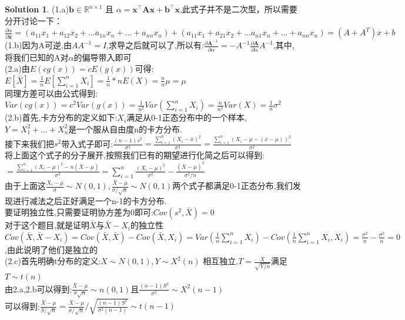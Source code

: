 \documentclass[a4paper,UTF8]{article}
\numberwithin{equation}{section}
\theoremstyle{definition}
\newtheorem*{solution}{Solution}
\def \A {\mathbf{A}}
\def \x {\boldsymbol{x}}
\def \b {\mathbf{b}}
\begin{document}
\begin{solution}
    (1.a)$\b\in\mathbb{R}^{n\times 1}$ 且 $\alpha=\x^\top\A\x + \b^\top \x$,此式子并不是二次型，所以需要分开讨论一下：\\
    $\frac{\partial \alpha}{\partial \x} = (a_{11} x_1 + a_{12}x_2 + ... a_{1n}x_n + ... + a_{nn} x_n) + (a_{11} x_1 + a_{21}x_2 + ... a_{n1}x_n + ... + a_{nn} x_n) = (A + A^T)x + b$\\
    (1.b)因为A可逆,由$A A^{-1} = I$,求导之后就可以了,所以有:$\frac{\partial \A^{-1}}{\partial \alpha}=-A^{-1} \frac{\partial\A}{\partial \alpha} A^{-1}$,其中,将我们已知的A对$\alpha$的偏导带入即可\\
    (2.a)由$E(cg(x))=cE(g(x))$可得:$E[\bar{X}] = \frac{1}{n} E[\sum_{i=1}^{n}X_i] = \frac{1}{n} * n E(X) = \frac{n}{n} \mu = \mu$\\
    同理方差可以由公式得到:$Var(cg(x))=c^2 Var(g(x)) = \frac{1}{n^2} Var(\sum_{i=1}^{n}X_i) = \frac{n}{n^2} Var(X) = \frac{1}{n} \sigma^2$\\
    (2.b)首先,卡方分布的定义如下:$X_i$满足从0-1正态分布中的一个样本,$Y=X_1^2+...+X_n^2$是一个服从自由度n的卡方分布.\\
    接下来我们把$s^2$带入式子即可:$\frac{(n-1)s^2}{\sigma^2}=\frac{\sum_{i=1}^{n}(X_i - \bar{x})^2}{\sigma^2}=\frac{\sum_{i=1}^{n}(X_i - \mu - (\bar{x} - \mu))^2}{\sigma^2}$\\
    将上面这个式子的分子展开,按照我们已有的期望进行化简之后可以得到:$=\frac{\sum_{i=1}^{n}(X_i - \mu)^2 - n(\bar{X} - \mu)}{\sigma^2} = \sum_{i=1}^{n}\frac{(X_i - \mu)^2}{\sigma^2} - \frac{(\bar{X} - \mu)^2}{\sigma^2 /n}$\\
    由于上面这$\frac{X_i - \mu}{\sigma} \sim N(0,1),\frac{\bar{X} - \mu}{\sigma / \sqrt{n}} \sim N(0,1)$两个式子都满足0-1正态分布,我们发现进行减法之后正好满足一个n-1的卡方分布.\\
    要证明独立性,只需要证明协方差为0即可:$Cov(s^2,\bar{X})=0$\\
    对于这个题目,就是证明$\bar{X}$与$\bar{X} - X_i$的独立性\\
    $Cov(\bar{X},\bar{X} - X_i) = Cov(\bar{X},\bar{X}) - Cov(\bar{X},X_i) = Var(\frac{1}{n}\sum_{i=1}^{n}X_i)-Cov(\frac{1}{n}\sum_{i=1}^{n}X_i ,X_i) = \frac{\sigma^2}{n} - \frac{\sigma^2}{n} = 0$,由此说明了他们是独立的\\
    (2.c)首先明确t分布的定义:$X \sim N(0,1),Y \sim X^2(n)$ 相互独立,$T = \frac{X}{\sqrt{Y/n}}$满足$T \sim t(n)$\\
    由2.a,2.b可以得到:$\frac{\bar{X} - \mu}{\sigma \sqrt{n}} \sim n(0,1)$且$\frac{(n-1)S^2}{\sigma^2} \sim X^2(n-1)$\\
    可以得到:$\frac{\bar{X} - \mu}{S/\sqrt{n}} = \frac{\bar{X} - \mu}{\sigma / \sqrt{n}}/ \sqrt{\frac{(n-1)S^2}{\sigma^2 (n-1)}} \sim t(n-1)$\\
\end{solution}
\end{document}
